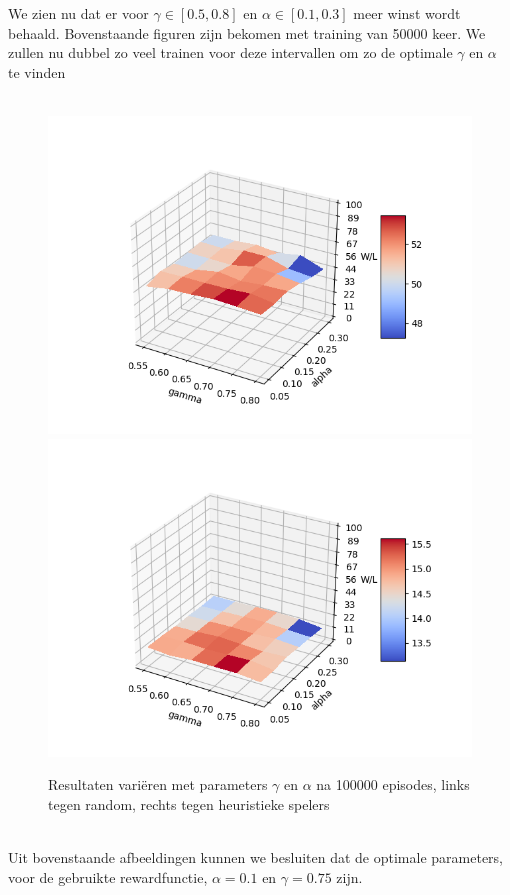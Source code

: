 \documentclass[11pt]{article}
\begin{document}
We zien nu dat er voor $\gamma \in [0.5, 0.8] $ en $\alpha \in [0.1, 0.3] $ meer winst wordt behaald. Bovenstaande figuren zijn bekomen met training van 50000 keer. We zullen nu dubbel zo veel trainen voor deze intervallen om zo de optimale $\gamma$ en $\alpha$ te vinden\\\\
\begin{figure}[h]
\centering
\includegraphics[scale=0.50]{images/qtable_parameter_random_zoomed.png}
\includegraphics[scale=0.50]{images/qtable_parameter_heuristic_zoomed.png}
\caption{Resultaten variëren met parameters $\gamma$ en $\alpha$ na 100000 episodes, links tegen random, rechts tegen heuristieke spelers}
\end{figure}\\
Uit bovenstaande afbeeldingen kunnen we besluiten dat de optimale parameters, voor de gebruikte rewardfunctie, $\alpha = 0.1$ en $\gamma = 0.75$ zijn.
\end{document}
